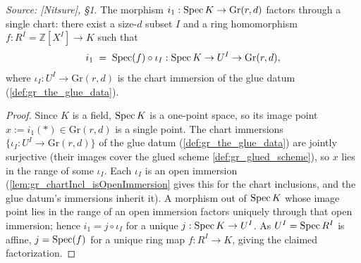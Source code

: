 \begin{lemma}\leanok
  \label{lem:gr_existence_chart_factorization}
  \textit{Source: [Nitsure], \S 1.}
  The morphism \(i_1 : \operatorname{Spec} K \to \mathrm{Gr}(r,d)\) factors through a single
  chart: there exist a size-\(d\) subset \(I\) and a ring homomorphism \(f : R^I =
  \mathbb{Z}[X^I] \to K\) such that
  \[
    i_1 \;=\; \operatorname{Spec}(f) \circ \iota_I : \operatorname{Spec} K \to U^I \to \mathrm{Gr}(r,d),
  \]
  where \(\iota_I : U^I \to \mathrm{Gr}(r,d)\) is the chart immersion of the glue
  datum (\cref{def:gr_the_glue_data}).
\end{lemma}
\begin{proof}
  \leanok
  Since \(K\) is a field, \(\operatorname{Spec} K\) is a one-point space, so its image point \(x
  := i_1(\ast) \in \mathrm{Gr}(r,d)\) is a single point. The chart immersions
  \(\{\iota_I : U^I \to \mathrm{Gr}(r,d)\}\) of the glue datum
  (\cref{def:gr_the_glue_data}) are jointly surjective (their images cover the
  glued scheme \cref{def:gr_glued_scheme}), so \(x\) lies in the range of some
  \(\iota_I\). Each \(\iota_I\) is an open immersion
  (\cref{lem:gr_chartIncl_isOpenImmersion} gives this for the chart inclusions, and
  the glue datum's immersions inherit it). A morphism out of \(\operatorname{Spec} K\) whose
  image point lies in the range of an open immersion factors uniquely through that
  open immersion; hence \(i_1 = j \circ \iota_I\) for a unique \(j : \operatorname{Spec} K \to
  U^I\). As \(U^I = \operatorname{Spec} R^I\) is affine, \(j = \operatorname{Spec}(f)\) for a unique ring map
  \(f : R^I \to K\), giving the claimed factorization.
\end{proof}

